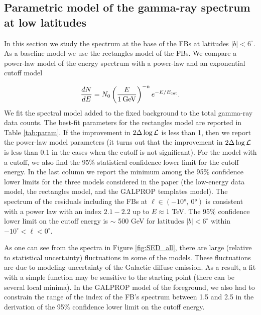 \subsection{Parametric model of the gamma-ray spectrum at low latitudes}
\label{sec:param_model}

In this section we study the spectrum at the base of the FBs at latitudes $|b| < 6^\circ$.
As a baseline model we use the rectangles model of the FBs.
We compare a power-law model of the energy spectrum with a power-law and an exponential cutoff model

\begin{equation}
\frac{dN}{dE} = N_0 \left( \frac{E}{1\:{\rm GeV}} \right)^{-n} e^{-E / E_{\rm cut}}.
\end{equation}
We fit the spectral model added to the fixed background to the total gamma-ray data counts.
The best-fit parameters for the rectangles model are reported in Table \ref{tab:param}.
If the improvement in $2 \Delta \log {\mathcal{L}}$ is less than 1, then we report the power-law model parameters
(it turns out that the improvement in $2 \Delta \log {\mathcal{L}}$ is less than 0.1 in the cases when the cutoff is not significant).
For the model with a cutoff, we also find the 95\% statistical confidence lower limit for the cutoff energy.
In the last column we report the minimum among the 95\% confidence lower limits for the three models considered in the paper
(the low-energy data model, the rectangles model, and the GALPROP templates model).
The spectrum of the residuals including the FBs at  $\ell \in (\ang{-10},\ \ang{0})$
is consistent with a power law with an index $2.1 - 2.2$ up to $E \approx 1$ TeV.
The 95\% confidence lower limit on the cutoff energy is $\sim$ 500 GeV for latitudes $|b| < 6^\circ$ within $-10^\circ < \ell < 0^\circ$.

As one can see from the spectra in Figure \ref{fig:SED_all}, there are large (relative to statistical uncertainty) fluctuations in some of the models.
These fluctuations are due to modeling uncertainty of the Galactic diffuse emission.
As a result, a fit with a simple function may be sensitive to the starting point (there can be several local minima).
In the GALPROP model of the foreground, we also had to constrain the range of the index of the FB's spectrum
between 1.5 and 2.5 in the derivation of the 95\% confidence lower limit on the cutoff energy.

